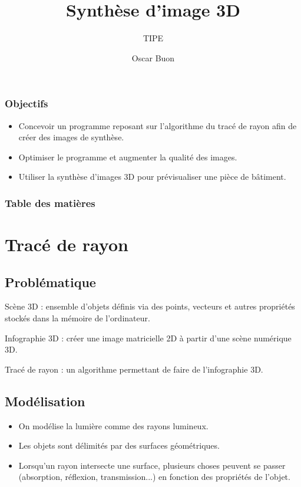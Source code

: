 \documentclass[handout]{beamer}
\title{Synthèse d’image 3D}
\subtitle{TIPE}
\author{Oscar Buon}
\begin{document}
\begin{frame}
    \maketitle
\end{frame}

\begin{frame}

    \frametitle{Objectifs}

    \begin{itemize}
        \item Concevoir un programme reposant sur l'algorithme du tracé de rayon afin de créer des images de synthèse.
        \item Optimiser le programme et augmenter la qualité des images.
        \item Utiliser la synthèse d'images 3D pour prévisualiser une pièce de bâtiment.
    \end{itemize}

\end{frame}

\begin{frame}
    \frametitle{Table des matières}
    \tableofcontents
\end{frame}

\section{Tracé de rayon}

\subsection{Problématique}

\begin{frame}
    Scène 3D : ensemble d'objets définis via des points, vecteurs et autres propriétés stockés dans la mémoire de l'ordinateur.

    Infographie 3D : créer une image matricielle 2D à partir d'une scène numérique 3D.

    Tracé de rayon : un algorithme permettant de faire de l'infographie 3D.
\end{frame}

\subsection{Modélisation}

\begin{frame}
    \begin{itemize}
        \item On modélise la lumière comme des rayons lumineux.
        \item Les objets sont délimités par des surfaces géométriques.
        \item Lorsqu'un rayon intersecte une surface, plusieurs choses peuvent se passer (absorption, réflexion, transmission...) en fonction des propriétés de l'objet.
    \end{itemize}
\end{frame}
\end{document}
